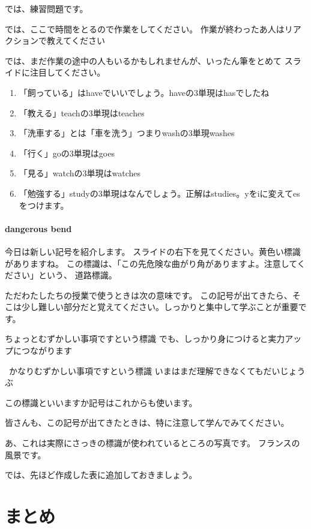\documentclass[book,jafontscale=0.9247]{jlreq}
\newcommand{\mySagyo}{%
\par%
\bigskip
では、ここで時間をとるので作業をしてください。
作業が終わったあ人はリアクションで教えてください\par%
\begin{minipage}[t]{.98\textwidth}
\mbox{}\hrulefill\mbox{}\par%
\mbox{}\hfill{}\raisebox{-.5\height}{作業}\hfill\mbox{}\par%
\mbox{}\hrulefill\mbox{}
\end{minipage}%
\par%
\bigskip%
では、まだ作業の途中の人もいるかもしれませんが、いったん筆をとめて
スライドに注目してください。%
\par%
\bigskip
}
\begin{document}
では、練習問題です。

\mySagyo

\begin{enumerate}
 \item 「飼っている」はhaveでいいでしょう。haveの3単現はhasでしたね
 \item 「教える」teachの3単現はteaches
 \item 「洗車する」とは「車を洗う」つまりwashの3単現washes
 \item 「行く」goの3単現はgoes
 \item 「見る」watchの3単現はwatches
 \item 「勉強する」studyの3単現はなんでしょう。正解はstudies。yをiに変えてesをつけます。
\end{enumerate}


\paragraph{dangerous bend}

今日は新しい記号を紹介します。
スライドの右下を見てください。黄色い標識がありますね。
この標識は、「この先危険な曲がり角がありますよ。注意してください」という、
道路標識。


ただわたしたちの授業で使うときは次の意味です。
この記号が出てきたら、そこは少し難しい部分だと覚えてください。しっかりと集中して学ぶことが重要です。




\dbend\hspace{10pt}%
ちょっとむずかしい事項ですという標識
でも、しっかり身につけると実力アップにつながります

\bigskip

\dbend\,\dbend\hspace{10pt}%
かなりむずかしい事項ですという標識
いまはまだ理解できなくてもだいじょうぶ

この標識といいますか記号はこれからも使います。

皆さんも、この記号が出てきたときは、特に注意して学んでみてください。

あ、これは実際にさっきの標識が使われているところの写真です。
フランスの風景です。


では、先ほど作成した表に追加しておきましょう。

\section{まとめ}
\end{document}
